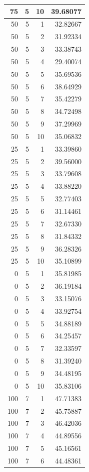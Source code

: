 \documentclass[
]{article}
\begin{document}
\begin{table}
\begin{tabular}[t]{r|r|r|r}
\hline
75 & 5 & 10 & 39.68077\\
\hline
50 & 5 & 1 & 32.82667\\
\hline
50 & 5 & 2 & 31.92334\\
\hline
50 & 5 & 3 & 33.38743\\
\hline
50 & 5 & 4 & 29.40074\\
\hline
50 & 5 & 5 & 35.69536\\
\hline
50 & 5 & 6 & 38.64929\\
\hline
50 & 5 & 7 & 35.42279\\
\hline
50 & 5 & 8 & 34.72498\\
\hline
50 & 5 & 9 & 37.29969\\
\hline
50 & 5 & 10 & 35.06832\\
\hline
25 & 5 & 1 & 33.39860\\
\hline
25 & 5 & 2 & 39.56000\\
\hline
25 & 5 & 3 & 33.79608\\
\hline
25 & 5 & 4 & 33.88220\\
\hline
25 & 5 & 5 & 32.77403\\
\hline
25 & 5 & 6 & 31.14461\\
\hline
25 & 5 & 7 & 32.67330\\
\hline
25 & 5 & 8 & 31.84332\\
\hline
25 & 5 & 9 & 36.28326\\
\hline
25 & 5 & 10 & 35.10899\\
\hline
0 & 5 & 1 & 35.81985\\
\hline
0 & 5 & 2 & 36.19184\\
\hline
0 & 5 & 3 & 33.15076\\
\hline
0 & 5 & 4 & 33.92754\\
\hline
0 & 5 & 5 & 34.88189\\
\hline
0 & 5 & 6 & 34.25457\\
\hline
0 & 5 & 7 & 32.33597\\
\hline
0 & 5 & 8 & 31.39240\\
\hline
0 & 5 & 9 & 34.48195\\
\hline
0 & 5 & 10 & 35.83106\\
\hline
100 & 7 & 1 & 47.71383\\
\hline
100 & 7 & 2 & 45.75887\\
\hline
100 & 7 & 3 & 46.42036\\
\hline
100 & 7 & 4 & 44.89556\\
\hline
100 & 7 & 5 & 45.16561\\
\hline
100 & 7 & 6 & 44.48361\\

\end{tabular}
\end{table}
\end{document}
